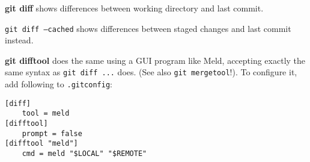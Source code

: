 %

\textbf{git diff} shows differences between working directory and last commit.

\texttt{git diff --cached} shows differences between staged changes and last commit instead.

\textbf{git difftool} does the same using a GUI program like Meld, accepting exactly the same syntax as \texttt{git diff ...} does.
(See also \texttt{git mergetool}!).
To configure it, add following to \texttt{.gitconfig}:
\begin{verbatim}
[diff]
    tool = meld
[difftool]
    prompt = false
[difftool "meld"]
    cmd = meld "$LOCAL" "$REMOTE"
\end{verbatim}

%